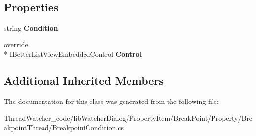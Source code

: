 \subsection*{Properties}
\begin{DoxyCompactItemize}
\item 
\hypertarget{classlib_watcher_dialog_1_1_property_item_1_1_break_point_1_1_property_1_1_breakpoint_thread_1_1_breakpoint_condition_a90edb8758a9ed205f5d1626493b57ace}{string {\bfseries Condition}}\label{classlib_watcher_dialog_1_1_property_item_1_1_break_point_1_1_property_1_1_breakpoint_thread_1_1_breakpoint_condition_a90edb8758a9ed205f5d1626493b57ace}

\item 
\hypertarget{classlib_watcher_dialog_1_1_property_item_1_1_break_point_1_1_property_1_1_breakpoint_thread_1_1_breakpoint_condition_a4294c880c51a87db73e947a210b403be}{override \\*
I\+Better\+List\+View\+Embedded\+Control {\bfseries Control}}\label{classlib_watcher_dialog_1_1_property_item_1_1_break_point_1_1_property_1_1_breakpoint_thread_1_1_breakpoint_condition_a4294c880c51a87db73e947a210b403be}

\end{DoxyCompactItemize}
\subsection*{Additional Inherited Members}


The documentation for this class was generated from the following file\+:\begin{DoxyCompactItemize}
\item 
Thread\+Watcher\+\_\+code/lib\+Watcher\+Dialog/\+Property\+Item/\+Break\+Point/\+Property/\+Breakpoint\+Thread/Breakpoint\+Condition.\+cs\end{DoxyCompactItemize}
